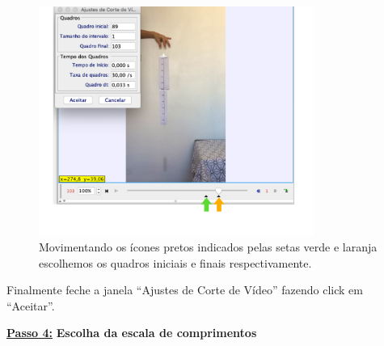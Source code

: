 \documentclass[12pt]{article}
\begin{document}
\begin{figure}[h!]
\includegraphics[width=9cm]{fig4AppB.pdf}
\caption{Movimentando os ícones pretos indicados pelas setas verde e laranja escolhemos os quadros iniciais e finais respectivamente.}
\label{fig4AppB}
\end{figure}
Finalmente feche a janela ``Ajustes de Corte de Vídeo'' fazendo click em ``Aceitar''.

\underline{\bf Passo 4:} {\bf Escolha da escala de comprimentos}\\
\indent 
\end{document}
